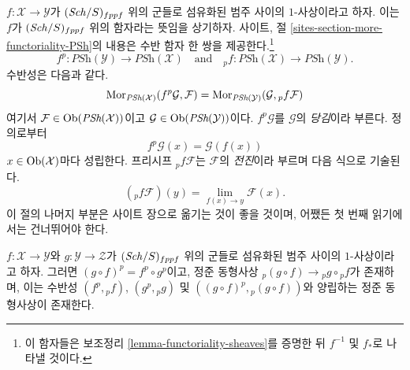 \medskip\noindent
$f : \mathcal{X} \to \mathcal{Y}$가 $(\mathit{Sch}/S)_{fppf}$ 위의 군들로
섬유화된 범주 사이의 $1$-사상이라고 하자. 이는 $f$가
$(\mathit{Sch}/S)_{fppf}$ 위의 함자라는 뜻임을 상기하자.
사이트, 절 \ref{sites-section-more-functoriality-PSh}의 내용은
수반 함자 한 쌍을 제공한다.\footnote{이 함자들은
보조정리 \ref{lemma-functoriality-sheaves}를 증명한 뒤
$f^{-1}$ 및 $f_*$로 나타낼 것이다.}
\begin{equation}
\label{equation-pushforward-pullback}
f^p : \textit{PSh}(\mathcal{Y}) \longrightarrow \textit{PSh}(\mathcal{X})
\quad\text{and}\quad
{}_pf : \textit{PSh}(\mathcal{X}) \longrightarrow \textit{PSh}(\mathcal{Y}).
\end{equation}
수반성은 다음과 같다.
$$
\mathop{\mathrm{Mor}}\nolimits_{\textit{PSh}(\mathcal{X})}(f^p\mathcal{G}, \mathcal{F})
=
\mathop{\mathrm{Mor}}\nolimits_{\textit{PSh}(\mathcal{Y})}(\mathcal{G}, {}_pf\mathcal{F})
$$
여기서 $\mathcal{F} \in \mathop{\mathrm{Ob}}\nolimits(\textit{PSh}(\mathcal{X}))$이고
$\mathcal{G} \in \mathop{\mathrm{Ob}}\nolimits(\textit{PSh}(\mathcal{Y}))$이다. $f^p\mathcal{G}$를
$\mathcal{G}$의 {\it 당김}이라 부른다. 정의로부터
$$
f^p\mathcal{G}(x) = \mathcal{G}(f(x))
$$
$x \in \mathop{\mathrm{Ob}}\nolimits(\mathcal{X})$마다 성립한다. 프리시프 ${}_pf\mathcal{F}$는
$\mathcal{F}$의 {\it 전진}이라 부르며 다음 식으로 기술된다.
$$
({}_pf\mathcal{F})(y) = \lim_{f(x) \to y} \mathcal{F}(x).
$$
이 절의 나머지 부분은 사이트 장으로 옮기는 것이 좋을 것이며,
어쨌든 첫 번째 읽기에서는 건너뛰어야 한다.

\begin{lemma}
\label{lemma-1-morphisms-presheaves}
$f : \mathcal{X} \to \mathcal{Y}$와 $g : \mathcal{Y} \to \mathcal{Z}$가
$(\mathit{Sch}/S)_{fppf}$ 위의 군들로 섬유화된 범주 사이의 $1$-사상이라고 하자.
그러면 $(g \circ f)^p = f^p \circ g^p$이고, 정준 동형사상
${}_p(g \circ f) \to {}_pg \circ {}_pf$가 존재하며, 이는 수반성
$(f^p, {}_pf)$, $(g^p, {}_pg)$ 및
$((g \circ f)^p, {}_p(g \circ f))$와 양립하는 정준 동형사상이
존재한다.
\end{lemma}

